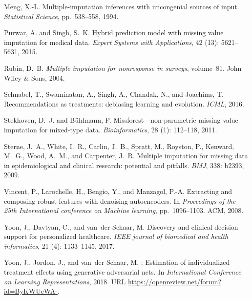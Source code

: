 \documentclass{article}
\begin{document}
\begin{thebibliography}{29}
	Meng, X.-L.
	\newblock Multiple-imputation inferences with uncongenial sources of input.
	\newblock \emph{Statistical Science}, pp.\  538--558, 1994.
	
	Purwar, A. and Singh, S.~K.
	\newblock Hybrid prediction model with missing value imputation for medical
	data.
	\newblock \emph{Expert Systems with Applications}, 42 (13):
	5621--5631, 2015.
	
	Rubin, D.~B.
	\newblock \emph{Multiple imputation for nonresponse in surveys}, volume~81.
	\newblock John Wiley \& Sons, 2004.
	
	Schnabel, T., Swaminatan, A., Singh, A., Chandak, N., and Joachims, T.
	\newblock Recommendations as treatments: debiasing learning and evolution.
	\newblock \emph{ICML}, 2016.
	
	Stekhoven, D.~J. and B{\"u}hlmann, P.
	\newblock Missforest—non-parametric missing value imputation for mixed-type
	data.
	\newblock \emph{Bioinformatics}, 28 (1): 112--118, 2011.
	
	Sterne, J.~A., White, I.~R., Carlin, J.~B., Spratt, M., Royston, P., Kenward,
	M.~G., Wood, A.~M., and Carpenter, J.~R.
	\newblock Multiple imputation for missing data in epidemiological and clinical
	research: potential and pitfalls.
	\newblock \emph{BMJ}, 338: b2393, 2009.
	
	Vincent, P., Larochelle, H., Bengio, Y., and Manzagol, P.-A.
	\newblock Extracting and composing robust features with denoising autoencoders.
	\newblock In \emph{Proceedings of the 25th International conference on Machine
		learning}, pp.\  1096--1103. ACM, 2008.
	
	Yoon, J., Davtyan, C., and van~der Schaar, M.
	\newblock Discovery and clinical decision support for personalized healthcare.
	\newblock \emph{IEEE journal of biomedical and health informatics}, 21
	(4): 1133--1145, 2017.
	
	Yoon, J., Jordon, J., and van~der Schaar, M.
	: Estimation of individualized treatment effects using
	generative adversarial nets.
	\newblock In \emph{International Conference on Learning Representations},
	2018{}.
	\newblock URL \url{https://openreview.net/forum?id=ByKWUeWA-}.
	

\end{thebibliography}
\end{document}
